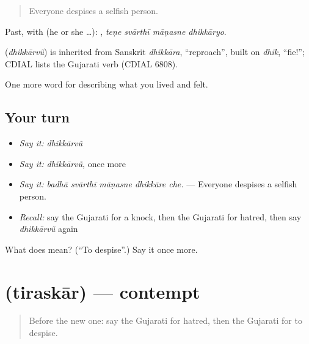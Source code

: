 \begin{quote}
Everyone despises a selfish person.
\end{quote}

Past, with  (he or she …):    , \emph{teṇe svārthī māṇasne dhikkāryo}.

\begin{cousinweb}
\textbf{} (\emph{dhikkārvũ}) is inherited from Sanskrit \emph{dhikkāra}, \textquotedblleft{}reproach\textquotedblright{}, built on \emph{dhik}, \textquotedblleft{}fie!\textquotedblright{}; CDIAL lists the Gujarati verb (CDIAL 6808).
\end{cousinweb}

\begin{grammarlens}[title={What you've built}]
One more word for describing what you lived and felt.
\end{grammarlens}

\subsection*{Your turn}
\begin{itemize}
\raggedright
  \item \emph{Say it:} \emph{dhikkārvũ}
  \item \emph{Say it:} \emph{dhikkārvũ}, once more
  \item \emph{Say it:} \emph{badhā svārthī māṇasne dhikkāre che.} — Everyone despises a selfish person.
  \item \emph{Recall:} say the Gujarati for a knock, then the Gujarati for hatred, then say \emph{dhikkārvũ} again
\end{itemize}

\begin{tcolorbox}[breakable,colback=teal!4,colframe=teal!35!black,title={Before you move on}]
What does  mean? (\textquotedblleft{}To despise\textquotedblright{}.) Say it once more.
\end{tcolorbox}
\section[\texorpdfstring{\gu{તિરસ્કાર} (tiraskār)}{તિરસ્કાર (tiraskār)}]{ (tiraskār) — contempt}

\label{lesson:GU-C457-tiraskar}



\begin{quote}
Before the new one: say the Gujarati for hatred, then the Gujarati for to despise.
\end{quote}


